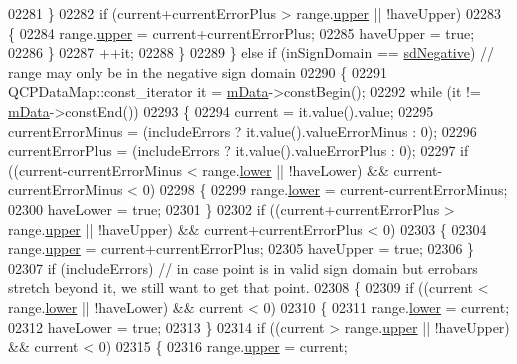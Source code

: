 \begin{DoxyCode}
02281       \}
02282       \textcolor{keywordflow}{if} (current+currentErrorPlus > range.\hyperlink{a00049_ae44eb3aafe1d0e2ed34b499b6d2e074f}{upper} || !haveUpper)
02283       \{
02284         range.\hyperlink{a00049_ae44eb3aafe1d0e2ed34b499b6d2e074f}{upper} = current+currentErrorPlus;
02285         haveUpper = \textcolor{keyword}{true};
02286       \}
02287       ++it;
02288     \}
02289   \} \textcolor{keywordflow}{else} \textcolor{keywordflow}{if} (inSignDomain == \hyperlink{a00024_a661743478a1d3c09d28ec2711d7653d8a0fc9a70796ef60ad18ddd18056e6dc63}{sdNegative}) \textcolor{comment}{// range may only be in the negative sign domain}
02290   \{
02291     QCPDataMap::const\_iterator it = \hyperlink{a00031_a8457c840f69a0ac49f61d30a509c5d08}{mData}->constBegin();
02292     \textcolor{keywordflow}{while} (it != \hyperlink{a00031_a8457c840f69a0ac49f61d30a509c5d08}{mData}->constEnd())
02293     \{
02294       current = it.value().value;
02295       currentErrorMinus = (includeErrors ? it.value().valueErrorMinus : 0);
02296       currentErrorPlus = (includeErrors ? it.value().valueErrorPlus : 0);
02297       \textcolor{keywordflow}{if} ((current-currentErrorMinus < range.\hyperlink{a00049_aa3aca3edb14f7ca0c85d912647b91745}{lower} || !haveLower) && current-currentErrorMinus < 0)
02298       \{
02299         range.\hyperlink{a00049_aa3aca3edb14f7ca0c85d912647b91745}{lower} = current-currentErrorMinus;
02300         haveLower = \textcolor{keyword}{true};
02301       \}
02302       \textcolor{keywordflow}{if} ((current+currentErrorPlus > range.\hyperlink{a00049_ae44eb3aafe1d0e2ed34b499b6d2e074f}{upper} || !haveUpper) && current+currentErrorPlus < 0)
02303       \{
02304         range.\hyperlink{a00049_ae44eb3aafe1d0e2ed34b499b6d2e074f}{upper} = current+currentErrorPlus;
02305         haveUpper = \textcolor{keyword}{true};
02306       \}
02307       \textcolor{keywordflow}{if} (includeErrors) \textcolor{comment}{// in case point is in valid sign domain but errobars stretch beyond it, we still
       want to get that point.}
02308       \{
02309         \textcolor{keywordflow}{if} ((current < range.\hyperlink{a00049_aa3aca3edb14f7ca0c85d912647b91745}{lower} || !haveLower) && current < 0)
02310         \{
02311           range.\hyperlink{a00049_aa3aca3edb14f7ca0c85d912647b91745}{lower} = current;
02312           haveLower = \textcolor{keyword}{true};
02313         \}
02314         \textcolor{keywordflow}{if} ((current > range.\hyperlink{a00049_ae44eb3aafe1d0e2ed34b499b6d2e074f}{upper} || !haveUpper) && current < 0)
02315         \{
02316           range.\hyperlink{a00049_ae44eb3aafe1d0e2ed34b499b6d2e074f}{upper} = current;

\end{DoxyCode}
